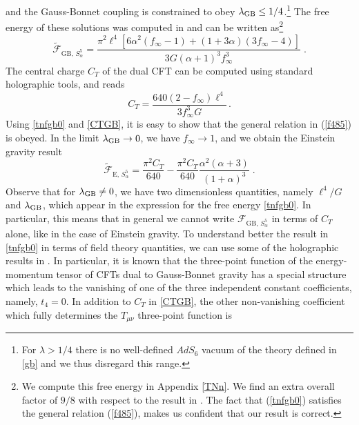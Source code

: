 \documentclass[12pt]{article}
\numberwithin{equation}{section}
\newcommand{\req}[1]{(\ref{#1})} %
\newcommand{\ssc}{\scriptscriptstyle}
\newcommand{\ctt}{C_{\ssc T}}
\begin{document}
%
 and the Gauss-Bonnet coupling is constrained to obey $\lambda_{\rm GB}\leq 1/4$.\footnote{For $\lambda>1/4$ there is no well-defined $AdS_6$ vacuum of the theory defined in \eqref{gb} and we thus disregard this range.} The free energy of these solutions was computed in \cite{Clarkson:2002uj,KhodamMohammadi:2008fh} and can be written as\footnote{We compute this free energy in Appendix \ref{TNn}. We find an extra overall factor of $9/8$ with respect to the result in \cite{Clarkson:2002uj,KhodamMohammadi:2008fh}. The fact that \req{tnfgb0} satisfies the general relation \req{f485}, makes us confident that our result is correct.}
%
\begin{equation}\label{tnfgb0}
\tilde{\mathcal{F}}_{\textrm{GB},\, S^{5}_{\alpha}}= \frac{  \pi ^2 \ell^4\left[6\alpha^2 (f_{\infty}-1)+(1+3\alpha)(3
	f_{\infty}-4)\right]}{3G (\alpha+1)^3 f_{\infty}^3 }\;.
\end{equation}
%
The central charge $\ctt$ of the dual CFT can be computed using standard holographic tools, and reads \cite{Buchel:2009sk}
%
\begin{equation}\label{CTGB}
\ctt=\frac{640(2-f_{\infty})\ell^4}{3f_{\infty}^3G}\,.
\end{equation}
%
Using \eqref{tnfgb0} and \eqref{CTGB}, it is easy to show that the general relation in \req{f485} is obeyed. In the limit $\lambda_{\rm GB}\rightarrow 0$,  we have $f_{\infty}\rightarrow 1$, and we obtain the Einstein gravity result
%
\begin{equation}\label{tnf555}
\tilde{\mathcal{F}}_{\textrm{E},\,S^5_{\alpha}}=\frac{  \pi ^2 \ctt}{640}-\frac{\pi^2\ctt}{640}\frac{\alpha^2(\alpha+3)}{(1+\alpha)^3}\;.
\end{equation}
%
Observe that for $\lambda_{\rm GB}\neq 0$, we have two dimensionless quantities, namely $\ell^4/G$ and $\lambda_{\rm GB}$, which appear in the expression for the free energy \eqref{tnfgb0}. In particular, this means that in general we cannot write $\mathcal{F}_{\textrm{GB},\, S^{5}_{\alpha}}$ in terms of $\ctt$ alone, like in the case of Einstein gravity.  To understand better the result in \eqref{tnfgb0} in terms of field theory quantities, we can use some of the holographic results in \cite{Buchel:2009sk}. In particular, it is known that the three-point function of the energy-momentum tensor of CFTs dual to Gauss-Bonnet gravity has a special structure which leads to the vanishing of one of the three independent constant coefficients, namely, $t_4=0$. In addition to $\ctt$ in \eqref{CTGB}, the other non-vanishing coefficient which fully determines the $T_{\mu\nu}$ three-point function is
\end{document}
